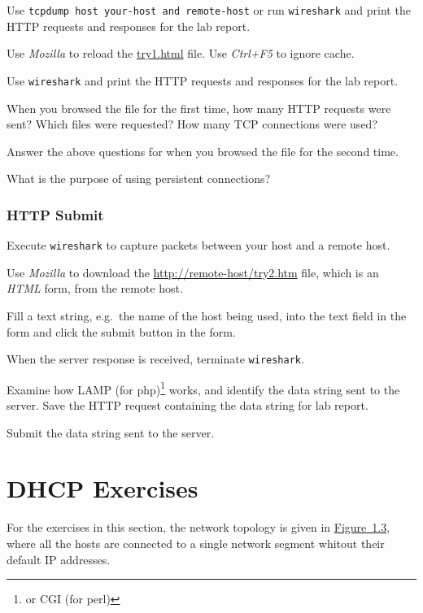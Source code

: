 \documentclass{../UTNetLab}
\begin{document}
    
    Use \lstinline[emph={your-host, remote-host},morekeywords={[3],host,and}]{tcpdump host your-host and remote-host} or run \lstinline{wireshark} and print the HTTP requests and responses for the lab report.
    
    Use \textit{Mozilla} to reload the \url{try1.html} file.
    Use \textit{Ctrl+F5} to ignore cache.

    Use \lstinline{wireshark} and print the HTTP requests and responses for the lab report.

    \begin{report}
        \item When you browsed the  file for the first time, how many HTTP requests were sent?
        Which files were requested?
        How many TCP connections were used?
        
        \item Answer the above questions for when you browsed the  file for the second time.
        
        \item What is the purpose of using persistent connections?
    \end{report}

\section{HTTP Submit}
    Execute \lstinline{wireshark} to capture packets between your host and a remote host.

    Use \textit{Mozilla} to download the \url{http://remote-host/try2.htm} file, which is an \textit{HTML} form, from the remote host.

    Fill a text string, e.g.\ the name of the host being used, into the text field in the form and click the submit button in the form.

    When the server response is received, terminate \lstinline{wireshark}.

    Examine how LAMP (for php)\footnote{or CGI (for perl)} works, and identify the data string sent to the server.
    Save the HTTP request containing the data string for lab report.

    \begin{report}
        \item Submit the data string sent to the server.
    \end{report}

\part{DHCP Exercises}
    For the exercises in this section, the network topology is given in \hyperref[fig:1.3]{Figure~1.3}, where all the hosts are connected to a single network segment whitout their default IP addresses.
\end{document}

